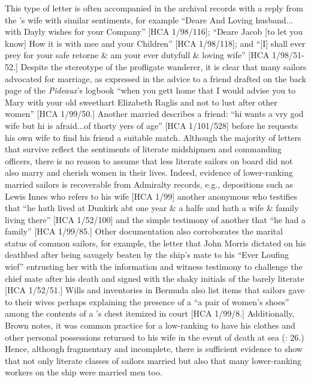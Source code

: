 This type of letter is often accompanied in the archival records with a reply from the ’s wife with similar sentiments, for example “Deare And Loving husband... with Dayly wishes for your Company” [HCA 1/98/116]; “Deare Jacob [to let you know] How it is with mee and your Children” [HCA 1/98/118]; and “[I] shall ever prey for your safe retorne \& am your ever dutyfull \& loving wife” [HCA 1/98/51-52.] Despite the stereotype of the profligate wanderer, it is clear that many sailors advocated for marriage, as expressed in the advice to a friend drafted on the back page of the \textit{Pideaux}’s logbook “when you gett home that I would advise you to Mary with your old sweethart Elizabeth Raglis and not to lust after other women” [HCA 1/99/50.] Another married  describes a friend: “hi wants a vry god wife but hi is afraid...of thorty yers of age” [HCA 1/101/528] before he requests his own wife to find his friend a suitable match. Although the majority of letters that survive reflect the sentiments of literate midshipmen and commanding officers, there is no reason to assume that less literate sailors on board did not also marry and cherish women in their lives. Indeed, evidence of lower-ranking married sailors is recoverable from Admiralty records, e.g., depositions such as Lewis Innes who refers to his wife [HCA 1/99] another anonymous  who testifies that “he hath lived at Dunkirk abt one year \& a halfe and hath a wife \& family living there” [HCA 1/52/100] and the simple testimony of another that “he had a family” [HCA 1/99/85.] Other documentation also corroborates the marital status of common sailors, for example, the letter that John Morris dictated on his deathbed after being savagely beaten by the ship’s mate to his “Ever Loufing wief” entrusting her with the information and witness testimony to challenge the chief mate after his death and signed with the shaky initials of the barely literate [HCA 1/52/51.] Wills and inventories in Bermuda also list items that sailors gave to their wives \citep[214]{Jarvis2010} perhaps explaining the presence of a “a pair of women’s shoes” among the contents of a ’s chest itemized in court [HCA 1/99/8.] Additionally, Brown notes, it was common practice for a low-ranking  to have his clothes and other personal possessions returned to his wife in the event of death at sea (\citealt{Brown2011}: 26.) Hence, although fragmentary and incomplete, there is sufficient evidence to show that not only literate classes of sailors married but also that many lower-ranking workers on the ship were married men too. 

